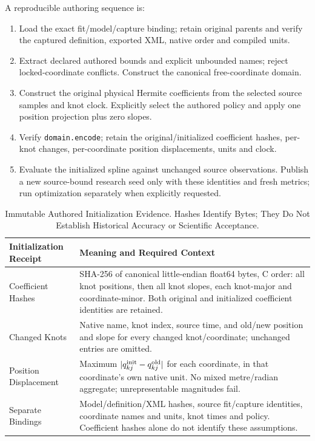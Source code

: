 \documentclass[11pt,letterpaper]{article}
\newcommand{\code}[1]{\nolinkurl{#1}}
\begin{document}
A reproducible authoring sequence is:
\begin{enumerate}
\item Load the exact fit/model/capture binding; retain original parents and
verify the captured definition, exported XML, native order and compiled units.
\item Extract declared authored bounds and explicit unbounded names; reject
locked-coordinate conflicts. Construct the canonical free-coordinate domain.
\item Construct the original physical Hermite coefficients from the selected
source samples and knot clock. Explicitly select the authored policy and apply
one position projection plus zero slopes.
\item Verify \code{domain.encode}; retain the original/initialized coefficient
hashes, per-knot changes, per-coordinate position displacements, units and clock.
\item Evaluate the initialized spline against unchanged source observations.
Publish a new source-bound research seed only with these identities and fresh
metrics; run optimization separately when explicitly requested.
\end{enumerate}

\begin{table}[ht]
\centering\small
\begin{tabular}{@{}p{1.8in}p{4.4in}@{}}
\toprule Initialization Receipt & Meaning and Required Context\\\midrule
Coefficient Hashes & SHA-256 of canonical little-endian float64 bytes,
C order: all knot positions, then all knot slopes, each knot-major and
coordinate-minor. Both original and initialized coefficient identities are retained.\\
Changed Knots & Native name, knot index, source time, and old/new position
and slope for every changed knot/coordinate; unchanged entries are omitted.\\
Position Displacement & Maximum $|q_{kj}^{\rm init}-q_{kj}^{\rm old}|$ for each
coordinate, in that coordinate's own native unit. No mixed metre/radian
aggregate; unrepresentable magnitudes fail.\\
Separate Bindings & Model/definition/XML hashes, source fit/capture identities,
coordinate names and units, knot times and policy. Coefficient hashes alone
do not identify these assumptions.\\
\bottomrule
\end{tabular}
\caption{Immutable Authored Initialization Evidence. Hashes Identify Bytes;
They Do Not Establish Historical Accuracy or Scientific Acceptance.}
\end{table}
\end{document}
